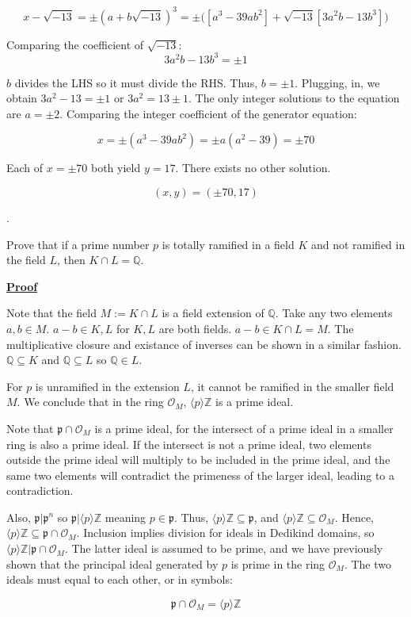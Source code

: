 \documentclass{article}
\def\ZZ{{\mathbb{Z}}}
\newcounter{problemcnt}
\newcommand{\Problem}{{
    \vspace{5mm}
    \stepcounter{problemcnt}
    \noindent
    \arabic{problemcnt}. 
}
}
\newcommand{\Proof}{{
    \vspace{2mm}
    \noindent
    \textbf{
    \underline{Proof}}
}
}
\newcommand{\<}{{{
    \langle
}}}
\def\>{{{
    \rangle
}}}
\def\ZZ{{\mathbb{Z}}}
\newcommand{\ringInt}{
    {\mathcal{O}}
}
\newcommand{\pideal}{
    {{\mathfrak{p}}}
}
\def\QQ{\mathbb{Q}}
\begin{document}
\[
    x-\sqrt{-13} = \pm (a+b\sqrt{-13})^3
    = \pm\bigg([a^3-39ab^2] + \sqrt{-13} [3a^2b -13b^3]\bigg)
\]

Comparing the coefficient of $\sqrt{-13}$:
\[
    3a^2b-13b^3 = \pm 1
\]

$b$ divides the LHS so it must divide the RHS. Thus, $b = \pm 1$. 
Plugging, in, we obtain $3a^2-13 = \pm1$ or $3a^2 = 13\pm1$. The only 
integer solutions to the equation are $a = \pm2$. Comparing the integer 
coefficient of the generator equation:

\[
    x = \pm (a^3-39ab^2) = \pm a (a^2-39) = \pm 70
\]

Each of $x =\pm70$ both yield $y = 17$. There exists no other solution. 

\[
\boxed{(x, y) = (\pm70, 17)}
\]

\Problem
Prove that if a prime number $p$ is totally ramified in a field 
$K$ and not ramified in the field $L$, then $K \cap L = \QQ$. 

\Proof 
Note that the field $M := K \cap L$ is a field extension of $\QQ$. 
Take any two elements $a, b \in M$. $a - b \in K, L$ for $K, L$ are 
both fields. $a-b \in K \cap L = M$. The multiplicative closure 
and existance of inverses
can be shown in a similar fashion. $\QQ \subseteq K$ and 
$\QQ \subseteq L$ so $\QQ \in L$. 

For $p$ is unramified in the extension $L$, it cannot be 
ramified in the smaller field $M$. We conclude that in the 
ring $\ringInt_M$, $\<p\>\ZZ$ is a prime ideal. 

Note that $\pideal \cap \ringInt_M$ is a prime ideal, for 
the intersect of a prime ideal in a smaller ring is also 
a prime ideal. If the intersect is not a prime ideal, 
two elements outside the prime ideal will multiply to 
be included in the prime ideal, and the same two elements 
will contradict the primeness of the larger ideal, leading 
to a contradiction. 

Also, $\pideal|\pideal^n$ so $\pideal|\<p\>\ZZ$ meaning $p \in \pideal$. 
Thus, $\<p\>\ZZ \subseteq \pideal$, and $\<p\>\ZZ \subseteq \ringInt_M$. Hence, 
$\<p\>\ZZ \subseteq \pideal \cap \ringInt_M$. Inclusion implies division 
for ideals in Dedikind domains, so $\<p\>\ZZ|\pideal \cap \ringInt_M$. 
The latter ideal is assumed to be prime, and we have previously shown 
that the principal ideal generated by $p$ is prime in the ring $\ringInt_M$. 
The two ideals must equal to each other, or in symbols:

\[
    \pideal \cap \ringInt_M = \<p\>\ZZ
\]
\end{document}
